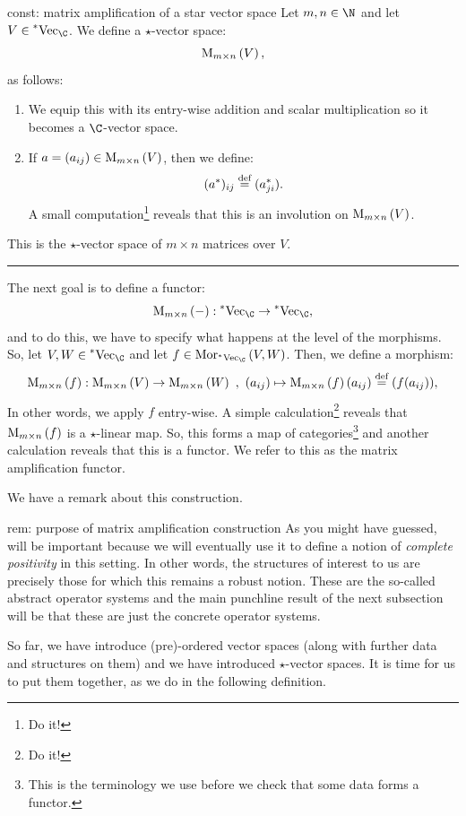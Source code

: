 \documentclass[main.tex]{subfiles}
\begin{document}
\begin{construction}{}{const: matrix amplification of a star vector space}
Let $m,n \in \N$ and let $V \in \StarVect$. We define a $\star$-vector space:
\[\text{M}_{m \times n}\left(V\right),\]  
as follows:
\begin{enumerate}
    \item We equip this with its entry-wise addition and scalar multiplication so it becomes a $\C$-vector space.   
    \item If $a = (a_{ij}) \in \text{M}_{m \times n}\left(V\right)$, then we define:   
    \[({a}^{*})_{ij} \stackrel{\text{def}}{=} ({a}^{*}_{ji}).\]
    A small computation\footnote{Do it!} reveals that this is an involution on $\text{M}_{m \times n}\left(V\right)$. 
\end{enumerate}
This is the $\star$-vector space of $m \times n$ matrices over $V$. 

\noindent\rule{8cm}{0.4pt}

The next goal is to define a functor: 
\[\Mat{m}{n}{-}: \StarVect \to \StarVect,\]    
and to do this, we have to specify what happens at the level of the morphisms. So, let $V,W \in \StarVect$ and let $f \in \Mor{\StarVect}{V}{W}$. Then, we define a morphism: 
\[\text{M}_{m \times n}\left(f\right): \text{M}_{m \times n}\left(V\right) \to \text{M}_{m \times n}\left(W\right) \ , \ (a_{ij}) \mapsto \text{M}_{m \times n}\left(f\right)(a_{ij}) \stackrel{\text{def}}{=} (f(a_{ij})),\]   
In other words, we apply $f$ entry-wise. A simple calculation\footnote{Do it!} reveals that $\text{M}_{m \times n}\left(f\right)$ is a $\star$-linear map. So, this forms a map of categories\footnote{This is the terminology we use before we check that some data forms a functor.} and another calculation reveals that this is a functor. We refer to this as the matrix amplification functor.
\end{construction}

We have a remark about this construction. 

\begin{remark}{}{rem: purpose of matrix amplification construction}
As you might have guessed,  will be important because we will eventually use it to define a notion of \emph{complete positivity} in this setting. In other words, the structures of interest to us are precisely those for which this remains a robust notion. These are the so-called abstract operator systems and the main punchline result of the next subsection will be that these are just the concrete operator systems.
\end{remark}

So far, we have introduce (pre)-ordered vector spaces (along with further data and structures on them) and we have introduced $\star$-vector spaces. It is time for us to put them together, as we do in the following definition. 
\end{document}
